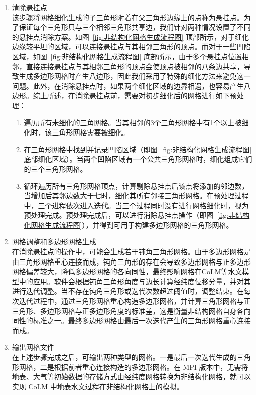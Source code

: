 \begin{enumerate}[label=\alph*)]
  \item 清除悬挂点\\
    该步骤将网格细化生成的子三角形附着在父三角形边缘上的点称为悬挂点。为了保证每个三角形只与三个相邻三角形共享边，我们针对两种情况设置了不同的悬挂点消除方案。如图~\ref{fig:非结构化网格生成流程图} 顶部所示，对于细化边缘较平坦的区域，可以连接悬挂点与其相邻三角形的顶点。而对于一些凹陷区域，如图~\ref{fig:非结构化网格生成流程图} 底部所示，由于多个悬挂点位置相邻，直接连接悬挂点与其相邻三角形的顶点会使顶点被相邻的八条边共享，导致生成多边形网格时产生八边形，因此我们采用了特殊的细化方法来避免这一问题。此外，在消除悬挂点时，如果两个细化区域的边界相遇，也容易产生八边形。综上所述，在消除悬挂点前，需要对初步细化后的网格进行如下预处理：
    \begin{enumerate}
      \item 遍历所有未细化的三角网格。当其相邻的3个三角形网格中有1个以上被细化时，该三角形网格需要被细化。
      \item 在三角形网格中找到并记录凹陷区域（即图~\ref{fig:非结构化网格生成流程图} 底部细化区域）。当两个凹陷区域有一个公共三角形网格时，细化组成它们的三个三角形网格。
      \item 循环遍历所有三角形网格顶点，计算剔除悬挂点后该点将添加的邻边数，当增加后其邻边数大于七时，细化其所有邻接三角形网格。在预处理过程中，三个进程依次进入迭代。当三个过程同时没有进行网格细化时，视为预处理完成。预处理完成后，可以进行消除悬挂点操作（即图~\ref{fig:非结构化网格生成流程图}），并得到可用于构建多边形网格的三角形网格。
    \end{enumerate}
  \item 网格调整和多边形网格生成\\
   在消除悬挂点的操作中，可能会生成若干钝角三角形网格。由于多边形网格是由三角形网格重心连接而成，钝角三角形的存在会导致多边形网格与正多边形网格偏差较大，降低多边形网格的各向同性，最终影响网格在CoLM等水文模型中的应用。软件会根据钝角三角形角度与边长计算经纬度位移分量，并对其进行迭代调整。当不存在钝角三角形或迭代次数超过阈值时，调整结束。在每次迭代过程中，通过三角形网格重心构造多边形网格，并计算三角形网格与正三角形、多边形网格与正多边形角度的标准差，这是衡量非结构网格自身各向同性的标准之一。最终多边形网格由最后一次迭代产生的三角形网格重心连接而成。
  \item 输出网格文件\\
    在上述步骤完成之后，可输出两种类型的网格。一是最后一次迭代生成的三角形网格，二是根据前者重心连接构造的多边形网格。在 MPI 版本中，无需将地表、大气等初始数据的存储方式由经纬度网格转换为非结构化网格，就可以实现 CoLM 中地表水文过程在非结构化网格上的模拟。
\end{enumerate}


